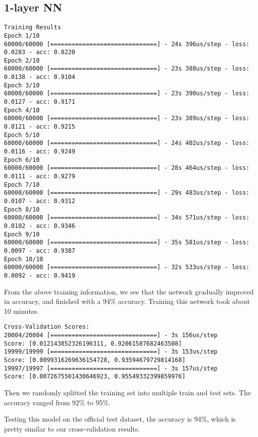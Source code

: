 \documentclass[12pt, a4paper]{article}
\begin{document}
\subsection{1-layer NN}
\begin{verbatim}
Training Results
Epoch 1/10
60000/60000 [==============================] - 24s 396us/step - loss: 0.0283 - acc: 0.8220
Epoch 2/10
60000/60000 [==============================] - 23s 388us/step - loss: 0.0138 - acc: 0.9104
Epoch 3/10
60000/60000 [==============================] - 23s 390us/step - loss: 0.0127 - acc: 0.9171
Epoch 4/10
60000/60000 [==============================] - 23s 389us/step - loss: 0.0121 - acc: 0.9215
Epoch 5/10
60000/60000 [==============================] - 24s 402us/step - loss: 0.0116 - acc: 0.9249
Epoch 6/10
60000/60000 [==============================] - 28s 464us/step - loss: 0.0111 - acc: 0.9279
Epoch 7/10
60000/60000 [==============================] - 29s 483us/step - loss: 0.0107 - acc: 0.9312
Epoch 8/10
60000/60000 [==============================] - 34s 571us/step - loss: 0.0102 - acc: 0.9346
Epoch 9/10
60000/60000 [==============================] - 35s 581us/step - loss: 0.0097 - acc: 0.9387
Epoch 10/10
60000/60000 [==============================] - 32s 533us/step - loss: 0.0092 - acc: 0.9419
\end{verbatim}
From the above training information, we see that the network gradually improved in accuracy, and finished with a 94\% accuracy. Training this network took about 10 minutes.

\begin{verbatim}
Cross-Validation Scores:
20004/20004 [==============================] - 3s 156us/step
Score: [0.012143852326196311, 0.92061587682463508]
19999/19999 [==============================] - 3s 153us/step
Score: [0.0099316269636154728, 0.93594679729814168]
19997/19997 [==============================] - 3s 157us/step
Score: [0.0072675501430646923, 0.95549332399859976]
\end{verbatim}

Then we randomly splitted the training set into multiple train and test sets. The accuracy ranged from 92\% to 95\%.

Testing this model on the official test dataset, the accuracy is 94\%, which is pretty similar to our cross-validation results.
\end{document}
